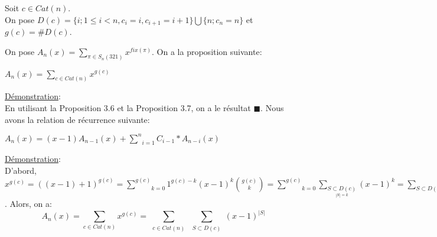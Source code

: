				 \begin{definition}
				 	\begin{rm}
				 		Soit $c \in Cat(n) $.\\
				 		On pose $D(c)=\{i; 1\leq i < n , c_{i}=i,c_{i+1}=i+1 \} \bigcup \{n; c_{n}=n\}$ et $g(c) = \#D(c)$.
				 	\end{rm}
				 \end{definition}

				On pose $A_{n}(x)= \underset{\pi \in S_{n}(321)}{\sum}x^{fix(\pi)}$. On a la proposition suivante:

				\begin{proposition}
					$A_{n}(x)= \underset{c \in Cat(n)}{\sum}x^{g(c)}$
				\end{proposition}

				\underline{Démonstration}:\\
				En utilisant la Proposition 3.6 et la Proposition 3.7, on a le résultat $\blacksquare$. Nous avons la relation de récurrence suivante:

				\begin{proposition}
					$A_{n}(x)=(x-1)A_{n-1}(x)+ \underset{i=1}{\overset{n}{\sum}}C_{i-1}*A_{n-i}(x)$
				\end{proposition}

				\underline{Démonstration}:\\
				D'abord, $x^{g(c)}= ((x-1)+1)^{g(c)}= \underset{k=0}{\overset{g(c)}{\sum}}1^{g(c)-k}(x-1)^{k}\binom{ g(c)}{ k}=\underset{k=0}{\overset{g(c)}{\sum}}\underset{\underset{|S|=k}{S\subset D(c)}}{\sum}(x-1)^k= \underset{S\subset D(c)}{\sum}(x-1)^{|S|}$. Alors, on a:
				\[ A_{n}(x)=\underset{c\in Cat(n)}{\sum}x^{g(c)}=\sum_{\substack{c\in Cat(n)\\}}\sum_{\substack{S\subset D(c)\\}}(x-1)^{|S|} \]